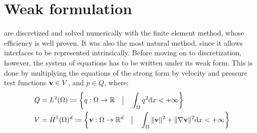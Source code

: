 \documentclass[11 pt]{report}
\begin{document}
\section{Weak formulation}
 are discretized and solved numerically with the finite element method, whose efficiency is well proven. It was also the most natural method, since it allows interfaces to be represented intrinsically. Before moving on to discretization, however, the system of equations has to be written under its weak form. This is done by multiplying the equations of the strong form by velocity and pressure test functions $\mathbf{v} \in V$, and $p\in Q$, where:
\begin{align}
    Q &= L^2(\Omega) \coloneqq \left\{q: \Omega \to \mathbb{R} \quad\big\vert\quad \int_\Omega q^2 \dd x < +\infty \right\}\\
    V &= H^1(\Omega)^d \coloneqq \left\{\mathbf{v} : \Omega \to \mathbb{R}^d \quad\big\vert\quad \int_\Omega \|\mathbf{v}\|^2 + \|\nabla \mathbf{v}\|^2 \dd x < +\infty\right\}
\end{align}
\end{document}
